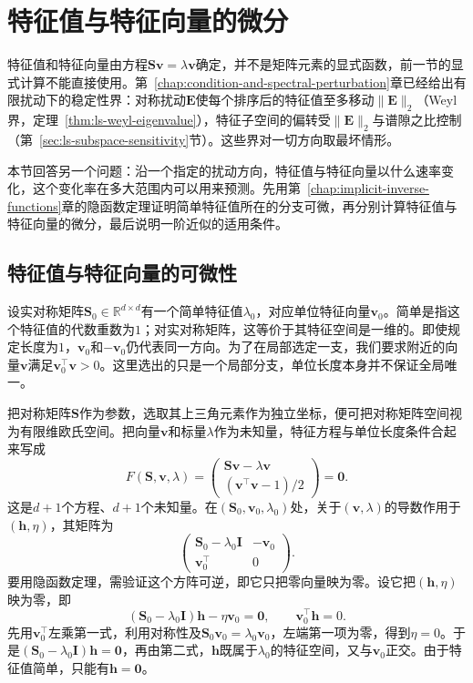\section{特征值与特征向量的微分}
\label{sec:multivariable-eigen-differential}

特征值和特征向量由方程$\bm S\bm v=\lambda\bm v$确定，并不是矩阵元素的显式函数，前一节的显式计算不能直接使用。第~\ref{chap:condition-and-spectral-perturbation}章已经给出有限扰动下的稳定性界：对称扰动$\bm E$使每个排序后的特征值至多移动$\lVert\bm E\rVert_2$（Weyl界，定理~\ref{thm:ls-weyl-eigenvalue}），特征子空间的偏转受$\lVert\bm E\rVert_2$与谱隙之比控制（第~\ref{sec:ls-subspace-sensitivity}节）。这些界对一切方向取最坏情形。

本节回答另一个问题：沿一个指定的扰动方向，特征值与特征向量以什么速率变化，这个变化率在多大范围内可以用来预测。先用第~\ref{chap:implicit-inverse-functions}章的隐函数定理证明简单特征值所在的分支可微，再分别计算特征值与特征向量的微分，最后说明一阶近似的适用条件。

\subsection{特征值与特征向量的可微性}
\label{sec:multivariable-eigen-differentiability}

设实对称矩阵$\bm S_0\in\mathbb R^{d\times d}$有一个简单特征值$\lambda_0$，对应单位特征向量$\bm v_0$。简单是指这个特征值的代数重数为$1$；对实对称矩阵，这等价于其特征空间是一维的。即使规定长度为$1$，$\bm v_0$和$-\bm v_0$仍代表同一方向。为了在局部选定一支，我们要求附近的向量$\bm v$满足$\bm v_0^\top\bm v>0$。这里选出的只是一个局部分支，单位长度本身并不保证全局唯一。

把对称矩阵$\bm S$作为参数，选取其上三角元素作为独立坐标，便可把对称矩阵空间视为有限维欧氏空间。把向量$\bm v$和标量$\lambda$作为未知量，特征方程与单位长度条件合起来写成
\[
 F(\bm S,\bm v,\lambda)=
 \begin{pmatrix}\bm S\bm v-\lambda\bm v\\ (\bm v^\top\bm v-1)/2\end{pmatrix}=\bm0.
\]
这是$d+1$个方程、$d+1$个未知量。在$(\bm S_0,\bm v_0,\lambda_0)$处，关于$(\bm v,\lambda)$的导数作用于$(\bm h,\eta)$，其矩阵为
\[
 \begin{pmatrix}\bm S_0-\lambda_0\bm I&-\bm v_0\\
 \bm v_0^\top&0\end{pmatrix}.
\]
要用隐函数定理，需验证这个方阵可逆，即它只把零向量映为零。设它把$(\bm h,\eta)$映为零，即
\[
 (\bm S_0-\lambda_0\bm I)\bm h-\eta\bm v_0=\bm0,\qquad \bm v_0^\top\bm h=0 .
\]
先用$\bm v_0^\top$左乘第一式，利用对称性及$\bm S_0\bm v_0=\lambda_0\bm v_0$，左端第一项为零，得到$\eta=0$。于是$(\bm S_0-\lambda_0\bm I)\bm h=\bm0$，再由第二式，$\bm h$既属于$\lambda_0$的特征空间，又与$\bm v_0$正交。由于特征值简单，只能有$\bm h=\bm0$。

